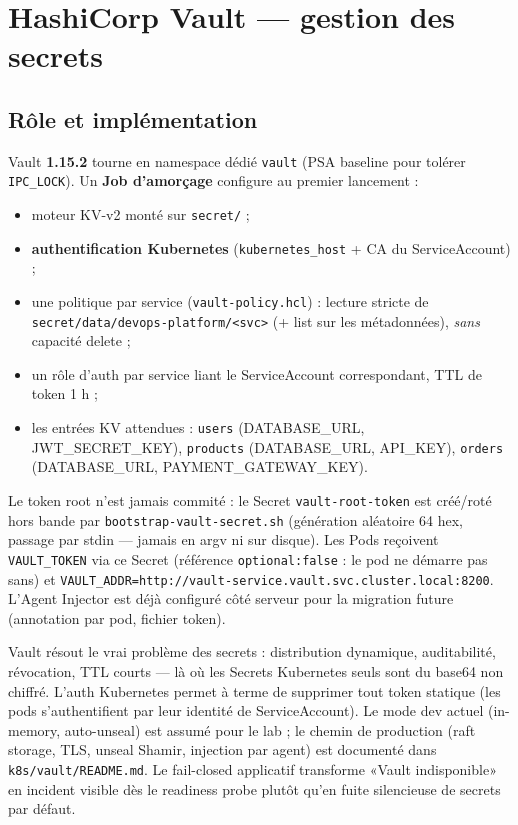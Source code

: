 \documentclass[11pt,a4paper]{article}
\begin{document}
\section{HashiCorp Vault --- gestion des secrets}

\subsection{Rôle et implémentation}
Vault \textbf{1.15.2} tourne en namespace dédié \texttt{vault} (PSA baseline pour tolérer \texttt{IPC\_LOCK}). Un \textbf{Job d'amorçage} configure au premier lancement :
\begin{itemize}[itemsep=1pt]
  \item moteur KV-v2 monté sur \texttt{secret/} ;
  \item \textbf{authentification Kubernetes} (\texttt{kubernetes\_host} + CA du ServiceAccount) ;
  \item une politique par service (\texttt{vault-policy.hcl}) : lecture stricte de \texttt{secret/data/devops-platform/<svc>} (+ list sur les métadonnées), \emph{sans} capacité delete ;
  \item un rôle d'auth par service liant le ServiceAccount correspondant, TTL de token 1 h ;
  \item les entrées KV attendues : \texttt{users} (DATABASE\_URL, JWT\_SECRET\_KEY), \texttt{products} (DATABASE\_URL, API\_KEY), \texttt{orders} (DATABASE\_URL, PAYMENT\_GATEWAY\_KEY).
\end{itemize}

Le token root n'est jamais commité : le Secret \texttt{vault-root-token} est créé/roté hors bande par \texttt{bootstrap-vault-secret.sh} (génération aléatoire 64 hex, passage par stdin --- jamais en argv ni sur disque). Les Pods reçoivent \texttt{VAULT\_TOKEN} via ce Secret (référence \texttt{optional:false} : le pod ne démarre pas sans) et \texttt{VAULT\_ADDR=http://vault-service.vault.svc.cluster.local:8200}. L'Agent Injector est déjà configuré côté serveur pour la migration future (annotation par pod, fichier token).

\begin{whybox}
Vault résout le vrai problème des secrets : distribution dynamique, auditabilité, révocation, TTL courts --- là où les Secrets Kubernetes seuls sont du base64 non chiffré. L'auth Kubernetes permet à terme de supprimer tout token statique (les pods s'authentifient par leur identité de ServiceAccount). Le mode dev actuel (in-memory, auto-unseal) est assumé pour le lab ; le chemin de production (raft storage, TLS, unseal Shamir, injection par agent) est documenté dans \texttt{k8s/vault/README.md}. Le fail-closed applicatif transforme «Vault indisponible» en incident visible dès le readiness probe plutôt qu'en fuite silencieuse de secrets par défaut.
\end{whybox}
\end{document}
